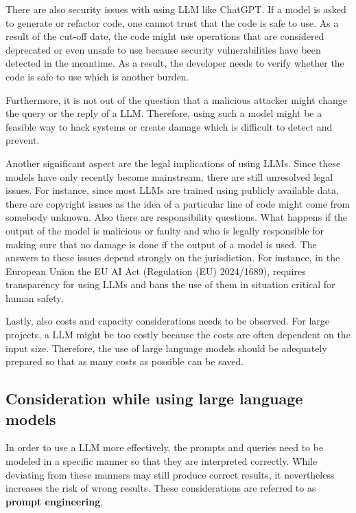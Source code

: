 There are also security issues with using  \ac{LLM} like ChatGPT. If a model is asked to generate or refactor code, one cannot trust that the code is safe to use. As a result of the cut-off date, the code might use operations that are considered deprecated or even unsafe to use because security vulnerabilities have been detected in the meantime. As a result, the developer needs to verify whether the code is safe to use which is another burden.  \cite{pearce2021asleep}

Furthermore, it is not out of the question that a malicious attacker might change the query or the reply of a \ac{LLM}. Therefore, using such a model might be a feasible way to hack systems or create damage which is difficult to detect and prevent. \cite{not_what_you_signed_for}

Another significant aspect are the legal implications of using \acp{LLM}. Since these models have only recently become mainstream, there are still unresolved legal issues. For instance, since most \acp{LLM} are trained using publicly available data, there are copyright issues as the idea of a particular line of code might come from somebody unknown. Also there are responsibility questions. What happens if the output of the model is malicious or faulty and who is legally responsible for making sure that no damage is done if the output of a model is used. The answers to these issues depend strongly on the jurisdiction. For instance, in the European Union the EU AI Act (Regulation (EU) 2024/1689), requires  transparency for using \acp{LLM} and bans the use of them in situation critical for human safety.  \cite{eu-ai-act}


Lastly, also costs and capacity considerations needs to be observed. For large projects, a \ac{LLM} might be too costly because  the costs are often dependent on the input size. Therefore, the use of large language models should be adequately prepared so that as many costs as possible can be saved.  \cite{chen2023frugalgpt}




\subsection{Consideration while using large language models}
In order to use a \ac{LLM} more effectively, the prompts and queries need to be modeled in a specific manner so that they are interpreted correctly. While deviating from these manners may still produce correct results, it nevertheless increases the risk of wrong results. These considerations are  referred to as \textbf{prompt engineering}.

